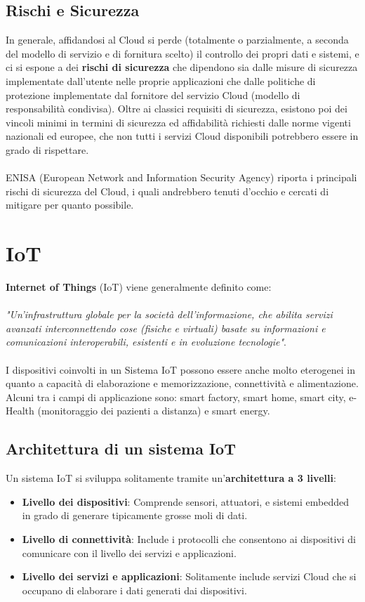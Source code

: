 \subsection{Rischi e Sicurezza}
In generale, affidandosi al Cloud si perde (totalmente o parzialmente, a
seconda del modello di servizio e di fornitura scelto) il controllo dei propri dati
e sistemi, e ci si espone a dei \textbf{rischi di sicurezza} che dipendono sia dalle misure
di sicurezza implementate dall’utente nelle proprie applicazioni che dalle
politiche di protezione implementate dal fornitore del servizio Cloud (modello
di responsabilità condivisa). Oltre ai classici requisiti di sicurezza, esistono poi dei vincoli minimi in termini di sicurezza ed affidabilità richiesti dalle norme vigenti nazionali ed europee, che non tutti i servizi Cloud disponibili potrebbero essere in grado di rispettare.
\\
\\
ENISA (European Network and Information Security Agency) riporta i principali rischi di sicurezza del Cloud, i quali andrebbero tenuti d'occhio e cercati di mitigare per quanto possibile. 

\section{IoT}
\textbf{Internet of Things} (IoT) viene generalmente definito come:
\\
\\
\textit{"Un’infrastruttura globale per la società dell’informazione, che abilita servizi avanzati interconnettendo cose (fisiche e virtuali) basate su informazioni e comunicazioni interoperabili, esistenti e in evoluzione tecnologie"}. 
\\
\\ 
I dispositivi coinvolti in un Sistema IoT possono essere anche molto eterogenei in quanto a capacità di elaborazione e memorizzazione, connettività e alimentazione. Alcuni tra i campi di applicazione sono: smart factory, smart home, smart city, e-Health (monitoraggio dei pazienti a distanza) e smart energy.

\subsection{Architettura di un sistema IoT}
Un sistema IoT si sviluppa solitamente tramite un'\textbf{architettura a 3 livelli}:
\begin{itemize}
	\item \textbf{Livello dei dispositivi}: Comprende sensori, attuatori, e sistemi embedded in grado di generare tipicamente grosse moli di dati.
	\item \textbf{Livello di connettività}: Include i protocolli che consentono ai dispositivi di comunicare con il livello dei servizi e applicazioni.
	\item \textbf{Livello dei servizi e applicazioni}: Solitamente include servizi Cloud
	che si occupano di elaborare i dati generati dai dispositivi.
\end{itemize}

